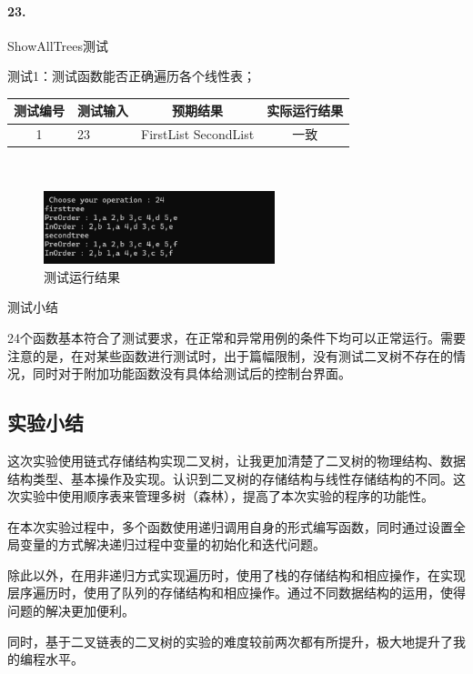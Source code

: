 \documentclass[supercite]{Experimental_Report}
\theoremstyle{definition}
\begin{document}
\paragraph{23.}ShowAllTrees测试
	
测试1：测试函数能否正确遍历各个线性表；

\vspace{0.5em}

\begin{tabular}{|c|p{2.7cm}|c|c|}
	\hline
	测试编号 & 测试输入 & 预期结果 & 实际运行结果 \\
	\hline
	1 & 23 & FirstList SecondList & 一致 \\
	\hline
\end{tabular}

~\

\begin{figure}[H]
 	\centering
 	\includegraphics[width=0.6\textwidth]{images/二叉树测试24.png}
 	\caption{测试运行结果}
 	\label{txlab}
 \end{figure}

测试小结

24个函数基本符合了测试要求，在正常和异常用例的条件下均可以正常运行。需要注意的是，在对某些函数进行测试时，出于篇幅限制，没有测试二叉树不存在的情况，同时对于附加功能函数没有具体给测试后的控制台界面。

\subsection{实验小结}

这次实验使用链式存储结构实现二叉树，让我更加清楚了二叉树的物理结构、数据结构类型、基本操作及实现。认识到二叉树的存储结构与线性存储结构的不同。这次实验中使用顺序表来管理多树（森林），提高了本次实验的程序的功能性。

在本次实验过程中，多个函数使用递归调用自身的形式编写函数，同时通过设置全局变量的方式解决递归过程中变量的初始化和迭代问题。

除此以外，在用非递归方式实现遍历时，使用了栈的存储结构和相应操作，在实现层序遍历时，使用了队列的存储结构和相应操作。通过不同数据结构的运用，使得问题的解决更加便利。

同时，基于二叉链表的二叉树的实验的难度较前两次都有所提升，极大地提升了我的编程水平。
\end{document}
